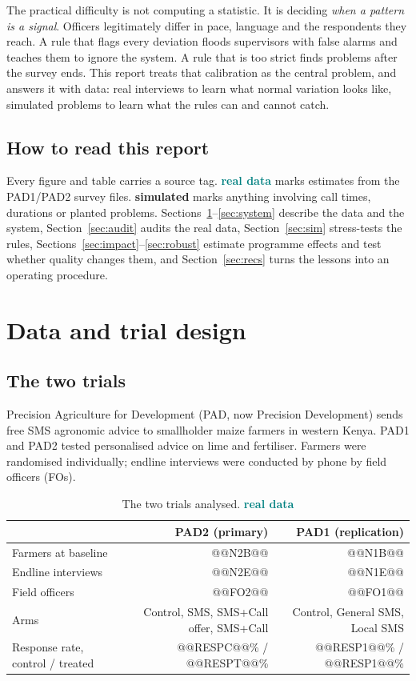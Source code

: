 \documentclass[11pt,a4paper]{article}
\newcommand{\simd}{\textcolor{amber}{\sffamily\bfseries simulated}}
\newcommand{\real}{\textcolor{teal}{\sffamily\bfseries real data}}
\begin{document}
The practical difficulty is not computing a statistic. It is deciding \emph{when a pattern is a signal}. Officers legitimately differ in pace, language and the respondents they reach. A rule that flags every deviation floods supervisors with false alarms and teaches them to ignore the system. A rule that is too strict finds problems after the survey ends. This report treats that calibration as the central problem, and answers it with data: real interviews to learn what normal variation looks like, simulated problems to learn what the rules can and cannot catch.

\subsection*{How to read this report}
Every figure and table carries a source tag. \real{} marks estimates from the PAD1/PAD2 survey files. \simd{} marks anything involving call times, durations or planted problems. Sections~\ref{sec:data}--\ref{sec:system} describe the data and the system, Section~\ref{sec:audit} audits the real data, Section~\ref{sec:sim} stress-tests the rules, Sections~\ref{sec:impact}--\ref{sec:robust} estimate programme effects and test whether quality changes them, and Section~\ref{sec:recs} turns the lessons into an operating procedure.

\section{Data and trial design}\label{sec:data}
\subsection{The two trials}
Precision Agriculture for Development (PAD, now Precision Development) sends free SMS agronomic advice to smallholder maize farmers in western Kenya. PAD1 and PAD2 tested personalised advice on lime and fertiliser. Farmers were randomised individually; endline interviews were conducted by phone by field officers (FOs).

\begin{table}[H]\centering\small\setlength{\tabcolsep}{6pt}
\begin{tabular}{lrr}\toprule & PAD2 (primary) & PAD1 (replication)\\\midrule
Farmers at baseline & @@N2B@@ & @@N1B@@\\ Endline interviews & @@N2E@@ & @@N1E@@\\ Field officers & @@FO2@@ & @@FO1@@\\
Arms & Control, SMS, SMS+Call offer, SMS+Call & Control, General SMS, Local SMS\\
Response rate, control / treated & @@RESPC@@\% / @@RESPT@@\% & @@RESP1@@\% / @@RESP1@@\%\\\bottomrule\end{tabular}
\caption{The two trials analysed. \real}\end{table}
\end{document}

